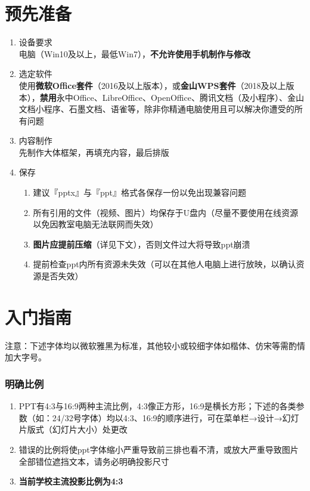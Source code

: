 \part[预先准备]{预先准备}
\begin{enumerate}
    \item 设备要求\\
          电脑（Win10及以上，最低Win7），\textbf{不允许使用手机制作与修改}
    \item 选定软件\\
          使用\textbf{微软Office套件}（2016及以上版本），或\textbf{金山WPS套件}（2018及以上版本），\textbf{禁用}永中Office、LibreOffice、OpenOffice、腾讯文档（及小程序）、金山文档小程序、石墨文档、语雀等，除非你精通电脑使用且可以解决你遭受的所有问题
    \item 内容制作\\
          先制作大体框架，再填充内容，最后排版
    \item 保存
          \begin{enumerate}
              \item 建议『pptx』与『ppt』格式各保存一份以免出现兼容问题
              \item 所有引用的文件（视频、图片）均保存于U盘内（尽量不要使用在线资源以免因教室电脑无法联网而失效）
              \item \textbf{图片应提前压缩}（详见下文），否则文件过大将导致ppt崩溃
              \item 提前检查ppt内所有资源未失效（可以在其他人电脑上进行放映，以确认资源是否失效）
          \end{enumerate}
\end{enumerate}

\part[入门指南]{入门指南}
注意：下述字体均以微软雅黑为标准，其他较小或较细字体如楷体、仿宋等需酌情加大字号。

\section[明确比例]{明确比例}
\begin{enumerate}
    \item PPT有4:3与16:9两种主流比例，4:3像正方形，16:9是横长方形；下述的各类参数（如：24/32号字体）均以4:3、16:9的顺序进行，可在菜单栏→设计→幻灯片版式（幻灯片大小）处更改
    \item 错误的比例将使ppt字体缩小严重导致前三排也看不清，或放大严重导致图片全部错位遮挡文本，请务必明确投影尺寸
    \item \textbf{当前学校主流投影比例为4:3}
\end{enumerate}


